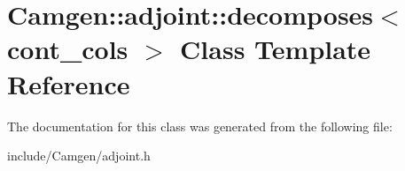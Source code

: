 \hypertarget{a00123}{}\section{Camgen\+:\+:adjoint\+:\+:decomposes$<$ cont\+\_\+cols $>$ Class Template Reference}
\label{a00123}


The documentation for this class was generated from the following file\+:\begin{DoxyCompactItemize}
\item 
include/\+Camgen/adjoint.\+h\end{DoxyCompactItemize}
